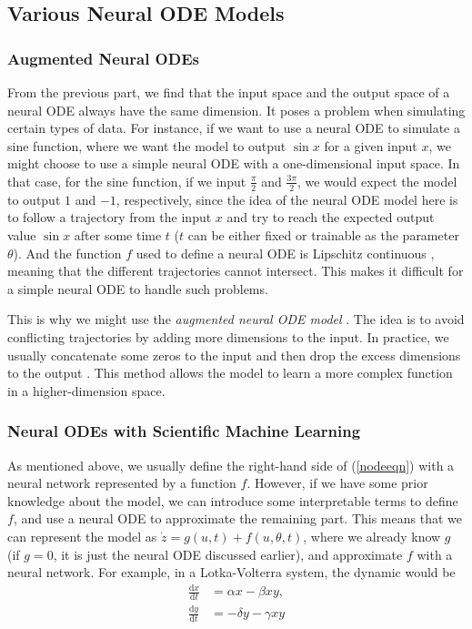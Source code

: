 \documentclass[a4paper,11pt,titlepage]{article}
\theoremstyle{definition}
\theoremstyle{plain}
\theoremstyle{remark}
\begin{document}
\subsection{Various Neural ODE Models}

\subsubsection{Augmented Neural ODEs}

From the previous part, we find that the input space and the output space of a neural ODE always have the same dimension. It poses a problem when simulating certain types of data. For instance, if we want to use a neural ODE to simulate a sine function, where we want the model to output $\sin x$ for a given input $x$, we might choose to use a simple neural ODE with a one-dimensional input space. In that case, for the sine function, if we input $\frac{\pi}{2}$ and $\frac{3\pi}{2}$, we would expect the model to output $1$ and $-1$, respectively, since the idea of the neural ODE model here is to follow a trajectory from the input $x$ and try to reach the expected output value $\sin x$ after some time $t$ ($t$ can be either fixed or trainable as the parameter $\theta$). And the function $f$ used to define a neural ODE is Lipschitz continuous \cite{chen2018neural}, meaning that the different trajectories cannot intersect. This makes it difficult for a simple neural ODE to handle such problems.

This is why we might use the \textit{augmented neural ODE model} \cite{dupont2019augmented}. The idea is to avoid conflicting trajectories by adding more dimensions to the input. In practice, we usually concatenate some zeros to the input and then drop the excess dimensions to the output \cite{nguyen2020exploration}. This method allows the model to learn a more complex function in a higher-dimension space.

\subsubsection{Neural ODEs with Scientific Machine Learning}

As mentioned above, we usually define the right-hand side of (\ref{nodeeqn}) with a neural network represented by a function $f$. However, if we have some prior knowledge about the model, we can introduce some interpretable terms to define $f$, and use a neural ODE to approximate the remaining part. This means that we can represent the model as $\dot{z}=g(u,t)+f(u,\theta,t)$, where we already know $g$ (if $g=0$, it is just the neural ODE discussed earlier), and approximate $f$ with a neural network. For example, in a Lotka-Volterra system, the dynamic would be
\begin{align*}
    \frac{\mathrm{d}x}{\mathrm{d}t}&=\alpha x-\beta xy,\\
    \frac{\mathrm{d}y}{\mathrm{d}t}&=-\delta y-\gamma xy
\end{align*}
\end{document}
